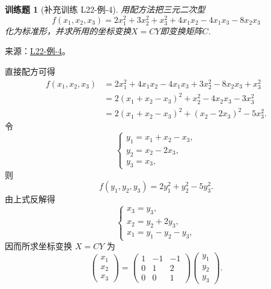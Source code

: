 \documentclass[UTF8,12pt,a4paper,fontset=fandol]{ctexart}
\newtheorem{exercise}{训练题}[section]
\begin{document}
\begin{exercise}[补充训练 L22-例-4]\label{prob:L22-例-4}
用配方法把三元二次型
    \[f(x_1,x_2,x_3)=2x_1^2+3x_2^2+x_3^2+4x_1x_2-4x_1x_3-8x_2x_3\]
    化为标准形，并求所用的坐标变换$X=CY$即变换矩阵$C$.
\end{exercise}
\noindent 来源：\href{https://github.com/yhwu-is/Linear-Algebra-Left-Undone/blob/new/%E8%AE%B2%E4%B9%89/%E4%B8%93%E9%A2%98/22%20%E4%BA%8C%E6%AC%A1%E5%9E%8B.tex}{L22-例-4}。
\begin{solve}
直接配方可得
    \begin{align*}
        f(x_1,x_2,x_3)
         & = 2x_1^2+4x_1x_2-4x_1x_3+3x_2^2-8x_2x_3+x_3^2 \\
         & = 2(x_1+x_2-x_3)^2+x_2^2-4x_2x_3-3x_3^2         \\
         & = 2(x_1+x_2-x_3)^2+(x_2-2x_3)^2-5x_3^2.
    \end{align*}
    令
    \[
        \begin{cases}
            y_1 = x_1+x_2-x_3, \\
            y_2 = x_2-2x_3,    \\
            y_3 = x_3,
        \end{cases}
    \]
    则
    \[
        f(y_1,y_2,y_3)=2y_1^2+y_2^2-5y_3^2.
    \]
    由上式反解得
    \[
        \begin{cases}
            x_3 = y_3,             \\
            x_2 = y_2+2y_3,        \\
            x_1 = y_1-y_2-y_3,
        \end{cases}
    \]
    因而所求坐标变换 $X=CY$ 为
    \[
        \begin{pmatrix}
            x_1 \\
            x_2 \\
            x_3
        \end{pmatrix}
        =
        \begin{pmatrix}
            1 & -1 & -1 \\
            0 & 1 & 2   \\
            0 & 0 & 1
        \end{pmatrix}
        \begin{pmatrix}
            y_1 \\
            y_2 \\
            y_3
        \end{pmatrix}.
    \]
\end{solve}
\end{document}

